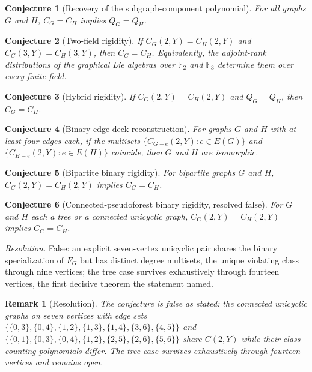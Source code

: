 \documentclass[11pt]{article}
\newtheorem{conjecture}{Conjecture}
\newtheorem{remark}{Remark}
\theoremstyle{definition}
\newcommand{\Fq}{\mathbb F}
\begin{document}
\begin{conjecture}[Recovery of the subgraph-component polynomial]\label{u2}
For all graphs $G$ and $H$, $C_G=C_H$ implies $Q_G=Q_H$.
\end{conjecture}

\begin{conjecture}[Two-field rigidity]\label{u3}
If $C_G(2,Y)=C_H(2,Y)$ and $C_G(3,Y)=C_H(3,Y)$, then $C_G=C_H$.  Equivalently, the adjoint-rank distributions of the graphical Lie algebras over $\Fq_2$ and $\Fq_3$ determine them over every finite field.
\end{conjecture}

\begin{conjecture}[Hybrid rigidity]\label{u4}
If $C_G(2,Y)=C_H(2,Y)$ and $Q_G=Q_H$, then $C_G=C_H$.
\end{conjecture}

\begin{conjecture}[Binary edge-deck reconstruction]\label{u5}
For graphs $G$ and $H$ with at least four edges each, if the multisets $\{C_{G-e}(2,Y):e\in E(G)\}$ and $\{C_{H-e}(2,Y):e\in E(H)\}$ coincide, then $G$ and $H$ are isomorphic.
\end{conjecture}

\begin{conjecture}[Bipartite binary rigidity]\label{u6}
For bipartite graphs $G$ and $H$, $C_G(2,Y)=C_H(2,Y)$ implies $C_G=C_H$.
\end{conjecture}

\begin{conjecture}[Connected-pseudoforest binary rigidity, resolved false]\label{u7}
For $G$ and $H$ each a tree or a connected unicyclic graph, $C_G(2,Y)=C_H(2,Y)$ implies $C_G=C_H$.
\end{conjecture}

\emph{Resolution.} False: an explicit seven-vertex unicyclic pair shares the binary specialization of $F_G$ but has distinct degree multisets, the unique violating class through nine vertices; the tree case survives exhaustively through fourteen vertices, the first decisive theorem the statement named.

\begin{remark}[Resolution]
The conjecture is false as stated: the connected unicyclic graphs on seven vertices with edge sets $\{\{0,3\},\{0,4\},\{1,2\},\{1,3\},\{1,4\},\{3,6\},\{4,5\}\}$ and $\{\{0,1\},\{0,3\},\{0,4\},\{1,2\},\{2,5\},\{2,6\},\{5,6\}\}$ share $C(2,Y)$ while their class-counting polynomials differ.  The tree case survives exhaustively through fourteen vertices and remains open.
\end{remark}
\end{document}
